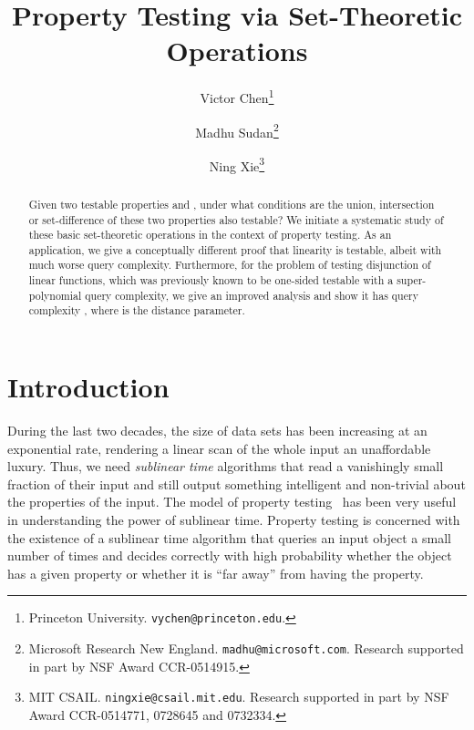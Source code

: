 \documentclass[11pt,english]{article}
\theoremstyle{definition}
\theoremstyle{remark}
\begin{document}
\title{Property Testing via Set-Theoretic Operations}


\author{Victor Chen\thanks{Princeton University. \texttt{vychen@princeton.edu}.} \and Madhu Sudan\thanks{Microsoft Research New England. \texttt{madhu@microsoft.com}.
Research supported in part by NSF Award CCR-0514915.} \and Ning Xie\thanks{MIT CSAIL. \texttt{ningxie@csail.mit.edu}. Research supported in part
by NSF Award CCR-0514771, 0728645 and 0732334.} }

\date{}
\maketitle
\setcounter{page}{0}
\begin{abstract}
Given two testable properties  and ,
under what conditions are the union, intersection or set-difference
of these two properties also testable?
We initiate a systematic study of these basic set-theoretic operations in the context of property
testing.
As an application, we give a conceptually different proof
that linearity is testable, albeit with much worse query complexity.
Furthermore, for the problem of testing disjunction of linear functions,
which was previously known to be one-sided testable with a super-polynomial query
complexity, we give an improved analysis and show it has query complexity , where  is the distance parameter.
\end{abstract}

\newpage




\section{\texorpdfstring{Introduction}{1. Introduction}}
\label{Sec:Introduction} 

During the last two decades, the size of data sets has been increasing at an exponential rate, 
rendering a linear scan of the whole input an unaffordable luxury. 
Thus, we need \emph{sublinear time} algorithms that read a vanishingly small 
fraction of their input and still output something intelligent and non-trivial
 about the properties of the input. 
The model of property testing~\cite{RS96,GGR98} has been
very useful in understanding the power of sublinear time. 
Property testing is concerned with the existence of a sublinear time 
algorithm that queries an input object a small number of times and
decides correctly with high probability whether the object has a given
property or whether it is  ``far away'' from having the property.
\end{document}
